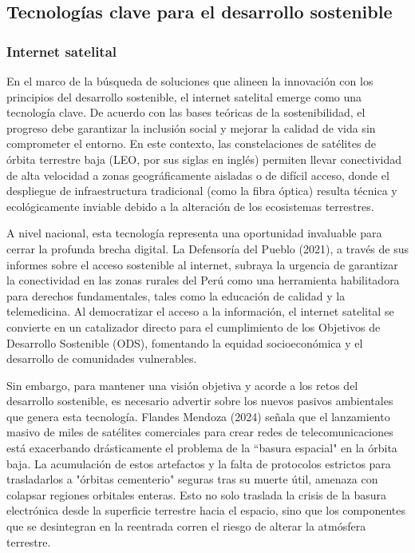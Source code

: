 \documentclass[stu,12pt,a4paper]{apa7}
\begin{document}
    \subsection{Tecnologías clave para el desarrollo sostenible}
    \subsubsection{Internet satelital}
    En el marco de la búsqueda de soluciones que alineen la innovación con los principios del desarrollo sostenible, el internet satelital emerge como una tecnología clave. De acuerdo con las bases teóricas de la sostenibilidad, el progreso debe garantizar la inclusión social y mejorar la calidad de vida sin comprometer el entorno. En este contexto, las constelaciones de satélites de órbita terrestre baja (LEO, por sus siglas en inglés) permiten llevar conectividad de alta velocidad a zonas geográficamente aisladas o de difícil acceso, donde el despliegue de infraestructura tradicional (como la fibra óptica) resulta técnica y ecológicamente inviable debido a la alteración de los ecosistemas terrestres.
    
A nivel nacional, esta tecnología representa una oportunidad invaluable para cerrar la profunda brecha digital. La Defensoría del Pueblo (2021), a través de sus informes sobre el acceso sostenible al internet, subraya la urgencia de garantizar la conectividad en las zonas rurales del Perú como una herramienta habilitadora para derechos fundamentales, tales como la educación de calidad y la telemedicina. Al democratizar el acceso a la información, el internet satelital se convierte en un catalizador directo para el cumplimiento de los Objetivos de Desarrollo Sostenible (ODS), fomentando la equidad socioeconómica y el desarrollo de comunidades vulnerables.

Sin embargo, para mantener una visión objetiva y acorde a los retos del desarrollo sostenible, es necesario advertir sobre los nuevos pasivos ambientales que genera esta tecnología. Flandes Mendoza (2024) señala que el lanzamiento masivo de miles de satélites comerciales para crear redes de telecomunicaciones está exacerbando drásticamente el problema de la ``basura espacial" en la órbita baja. La acumulación de estos artefactos y la falta de protocolos estrictos para trasladarlos a "órbitas cementerio" seguras tras su muerte útil, amenaza con colapsar regiones orbitales enteras. Esto no solo traslada la crisis de la basura electrónica desde la superficie terrestre hacia el espacio, sino que los componentes que se desintegran en la reentrada corren el riesgo de alterar la atmósfera terrestre.
\end{document}
